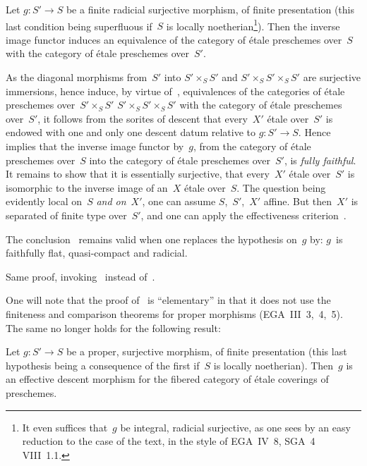 \begin{theorem}
\label{IX.4.10}
Let $g\colon S'\to S$ be a finite radicial surjective morphism, of
finite presentation (this last condition being
superfluous if~$S$ is locally noetherian\footnote{It even suffices
that~$g$ be integral, radicial surjective, as one sees by
an easy reduction to the case of the text, in the style of EGA~IV~8, \cf SGA~4
VIII~1.1.}).
Then the inverse image functor induces an equivalence of the
category of \'etale preschemes over~$S$ with the
category of \'etale preschemes over~$S'$.
\end{theorem}

As the diagonal morphisms from~$S'$ into $S'\times_S S'$ and
$S'\times_S S'\times_S S'$ are surjective immersions, hence
induce, by virtue of~, equivalences of the
categories of \'etale preschemes over~$S'\times_S S'$
\resp $S'\times_S S'\times_S S'$ with the category of
\'etale preschemes over~$S'$, it follows from the sorites of
descent \cite{IX.D} that every~$X'$ \'etale over~$S'$ is endowed with one
and only one descent datum relative to $g\colon
S'\to S$. Hence~ implies that the inverse image functor
by~$g$, from the category of \'etale preschemes over~$S$
into the category of \'etale preschemes over~$S'$, is
\emph{fully faithful}. It remains to show that it is
essentially surjective, \ie that every~$X'$ \'etale over~$S'$ is
isomorphic to the inverse image of an~$X$ \'etale over~$S$. The
question being evidently local on~$S$ \emph{and on}~$X'$,
one can assume $S$,~$S'$,~$X'$ affine. But then~$X'$ is
separated of finite type over~$S'$, and one can apply the
effectiveness criterion~.

\begin{corollary}
\label{IX.4.11}
The conclusion~ remains valid when one replaces the hypothesis
on~$g$ by: $g$~is faithfully flat, quasi-compact and radicial.
\end{corollary}

Same proof, invoking~ instead
of~.

One will note that the proof of~ is
``elementary'' in that it does not use the
finiteness and comparison theorems for proper morphisms (EGA~III~3,~4,~5). The same no longer holds for the following result:

\begin{theorem}
\label{IX.4.12}
Let $g\colon S'\to S$ be a proper, surjective morphism, of
finite presentation (this last hypothesis being a
consequence of the first if~$S$ is locally
noetherian). Then~$g$ is an effective descent morphism
for the fibered category of \'etale coverings of
preschemes.
\end{theorem}

